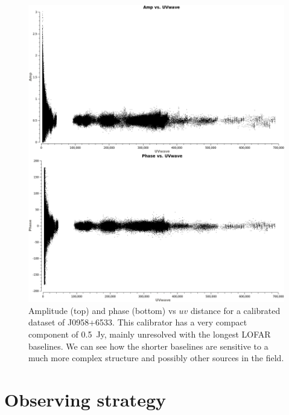 \documentclass[graybox]{svmult}
\begin{document}
\begin{figure}[htbp]
\begin{center}
\includegraphics[width=\textwidth]{figures/radplot.png}
\caption{Amplitude (top) and phase (bottom) vs $uv$ distance for a calibrated
dataset of J0958+6533. This calibrator has a very compact component of 0.5~Jy,
mainly unresolved with the longest LOFAR baselines. We can see how the shorter
baselines are sensitive to a much more complex structure and possibly other
sources in the field.}
\label{fig:radplot}
\end{center}
\end{figure}

\section{Observing strategy}
\end{document}
